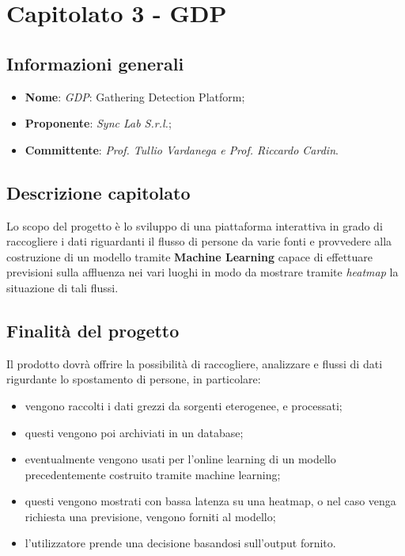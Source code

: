 \section{Capitolato 3 - GDP}
\subsection{Informazioni generali}
\begin{itemize}
    \item \textbf{Nome}: \emph{GDP}: Gathering Detection Platform;
    \item \textbf{Proponente}: \emph{Sync Lab S.r.l.};
    \item \textbf{Committente}: \emph{Prof. Tullio Vardanega e Prof. Riccardo Cardin}.
\end{itemize}
\subsection{Descrizione capitolato}
Lo scopo del progetto è lo sviluppo di una piattaforma interattiva in grado di raccogliere i dati riguardanti il flusso di persone da varie fonti e provvedere alla costruzione di un modello tramite \textbf{Machine Learning} capace di effettuare previsioni sulla affluenza nei vari luoghi in modo da mostrare tramite \emph{heatmap} la situazione di tali flussi.
\subsection{Finalità del progetto}
Il prodotto dovrà offrire la possibilità di raccogliere, analizzare e flussi di dati rigurdante lo spostamento di persone, in particolare:
\begin{itemize}
    \item vengono raccolti i dati grezzi da sorgenti eterogenee, e processati;
    \item questi vengono poi archiviati in un database;
    \item eventualmente vengono usati per l'online learning di un modello precedentemente costruito tramite machine learning;
    \item questi vengono mostrati con bassa latenza su una heatmap, o nel caso venga richiesta una previsione, vengono forniti al modello;
    \item l'utilizzatore prende una decisione basandosi sull'output fornito.
\end{itemize}
